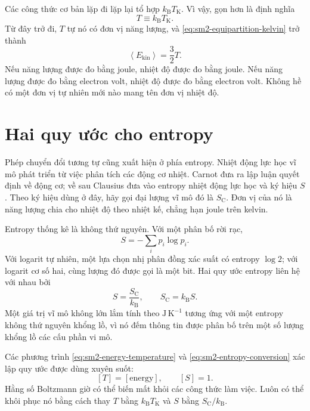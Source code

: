 Các công thức cơ bản lặp đi lặp lại tổ hợp
\(k_{\mathrm B}T_{\mathrm K}\). Vì vậy, gọn hơn là định nghĩa
\begin{equation}
 T\equiv k_{\mathrm B}T_{\mathrm K}.
 \label{eq:sm2-energy-temperature}
\end{equation}
Từ đây trở đi, \(T\) tự nó có đơn vị năng lượng, và
\eqref{eq:sm2-equipartition-kelvin} trở thành
\begin{equation}
 \left\langle E_{\mathrm{kin}}\right\rangle=\frac{3}{2}T.
 \label{eq:sm2-equipartition-natural}
\end{equation}
Nếu năng lượng được đo bằng joule, nhiệt độ được đo bằng joule. Nếu năng lượng được đo bằng electron volt, nhiệt độ được đo bằng electron volt. Không hề có một đơn vị tự nhiên mới nào mang tên đơn vị nhiệt độ.

\section{Hai quy ước cho entropy}

Phép chuyển đổi tương tự cũng xuất hiện ở phía entropy. Nhiệt động lực học vĩ mô phát triển từ việc phân tích các động cơ nhiệt. Carnot đưa ra lập luận quyết định về động cơ; về sau Clausius đưa vào entropy nhiệt động lực học và ký hiệu
\(S\). Theo ký hiệu dùng ở đây, hãy gọi đại lượng vĩ mô đó là
\(S_{\mathrm C}\). Đơn vị của nó là năng lượng chia cho nhiệt độ theo nhiệt kế,
chẳng hạn joule trên kelvin.

Entropy thống kê là không thứ nguyên. Với một phân bố rời rạc,
\begin{equation}
 S=-\sum_i p_i\log p_i.
 \label{eq:sm2-statistical-entropy}
\end{equation}
Với logarit tự nhiên, một lựa chọn nhị phân đồng xác suất có entropy \(\log2\); với logarit cơ số hai, cùng lượng đó được gọi là một bit. Hai quy ước entropy liên hệ với nhau bởi
\begin{equation}
 S=\frac{S_{\mathrm C}}{k_{\mathrm B}},
 \qquad
 S_{\mathrm C}=k_{\mathrm B}S.
 \label{eq:sm2-entropy-conversion}
\end{equation}
Một giá trị vĩ mô không lớn lắm tính theo \(\mathrm{J\,K^{-1}}\) tương ứng với một entropy không thứ nguyên khổng lồ, vì nó đếm thông tin được phân bố trên một số lượng khổng lồ các cấu phần vi mô.

Các phương trình \eqref{eq:sm2-energy-temperature} và
\eqref{eq:sm2-entropy-conversion} xác lập quy ước được dùng xuyên suốt:
\[
 [T]=[\text{energy}],
 \qquad
 [S]=1.
\]
Hằng số Boltzmann giờ có thể biến mất khỏi các công thức làm việc. Luôn có thể khôi phục nó bằng cách thay \(T\) bằng \(k_{\mathrm B}T_{\mathrm K}\) và
\(S\) bằng \(S_{\mathrm C}/k_{\mathrm B}\).

